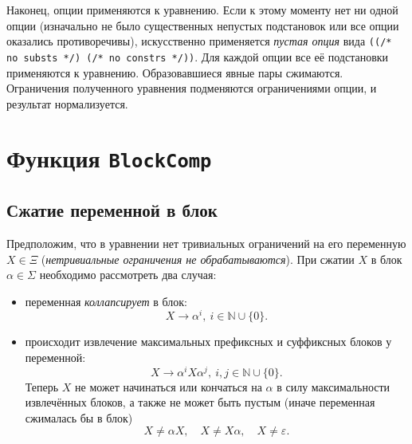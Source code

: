 \documentclass[12pt]{article}
\begin{document}
Наконец, опции применяются к уравнению. Если к этому моменту нет ни одной опции
(изначально не было существенных непустых подстановок или все опции оказались
противоречивы), искусственно применяется \textit{пустая опция} вида
\texttt{((/* no substs */) (/* no constrs */))}. Для каждой опции все её
подстановки применяются к уравнению. Образовавшиеся явные пары сжимаются.
Ограничения полученного уравнения подменяются ограничениями опции, и результат
нормализуется.



\section{Функция \texttt{BlockComp}} \label{blockComp}


\subsection{Сжатие переменной в блок} \label{block-comp}

Предположим, что в уравнении нет тривиальных ограничений на его переменную $X
\in \Xi$ (\textit{нетривиальные ограничения не обрабатываются}). При сжатии $X$
в блок $\alpha \in \Sigma$ необходимо рассмотреть два случая:
\begin{itemize}
  \item переменная \textit{коллапсирует} в блок:
  \begin{equation} \label{block:collapsed}
    X \to \alpha^i, \ i \in \mathbb{N} \cup \{ 0 \}.
  \end{equation}

  \item происходит извлечение максимальных префиксных и суффиксных блоков у
  переменной:
  \begin{equation} \label{block:extracted}
    X \to \alpha^i X \alpha^j, \ i, j \in \mathbb{N} \cup \{ 0 \}.
  \end{equation}
  Теперь $X$ не может начинаться или кончаться на $\alpha$ в силу
  максимальности извлечённых блоков, а также не может быть пустым (иначе
  переменная сжималась бы в блок)
  \begin{equation} \label{block:constraints}
    X \ne \alpha X, \quad X \ne X \alpha, \quad X \ne \varepsilon.
  \end{equation}
\end{itemize}
\end{document}
